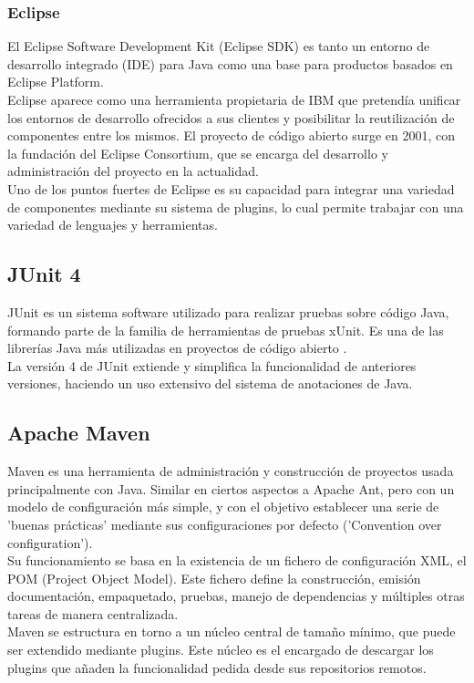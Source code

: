 \subsubsection{Eclipse}

El Eclipse Software Development Kit (Eclipse SDK) es tanto un entorno de desarrollo integrado (IDE) para Java como una base para productos basados en Eclipse Platform.
\\
Eclipse aparece como una herramienta propietaria de IBM que pretendía unificar los entornos de desarrollo ofrecidos a sus clientes y posibilitar la reutilización de componentes entre los mismos.
El proyecto de código abierto surge en 2001, con la fundación del Eclipse Consortium, que se encarga del desarrollo y administración del proyecto en la actualidad. \cite{website:eclipseFAQ}
\\
Uno de los puntos fuertes de Eclipse es su capacidad para integrar una variedad de componentes mediante su sistema de plugins, lo cual permite trabajar con una variedad de lenguajes y herramientas.

\subsection{JUnit 4}

JUnit es un sistema software utilizado para realizar pruebas sobre código Java, formando parte de la familia de herramientas de pruebas xUnit.
Es una de las librerías Java más utilizadas en proyectos de código abierto \cite{website:githubTOP}.
\\
La versión 4 de JUnit extiende y simplifica la funcionalidad de anteriores versiones, haciendo un uso extensivo del sistema de anotaciones de Java.

\subsection{Apache Maven}

Maven es una herramienta de administración y construcción de proyectos usada principalmente con Java.
Similar en ciertos aspectos a Apache Ant, pero con un modelo de configuración más simple, y con el objetivo establecer una serie de 'buenas prácticas' mediante sus configuraciones por defecto ('Convention over configuration').
\\
Su funcionamiento se basa en la existencia de un fichero de configuración XML, el POM (Project Object Model).
Este fichero define la construcción, emisión documentación, empaquetado, pruebas, manejo de dependencias y múltiples otras tareas de manera centralizada\cite{mvnEx}.
\\
Maven se estructura en torno a un núcleo central de tamaño mínimo, que puede ser extendido mediante plugins.
Este núcleo es el encargado de descargar los plugins que añaden la funcionalidad pedida desde sus repositorios remotos.



